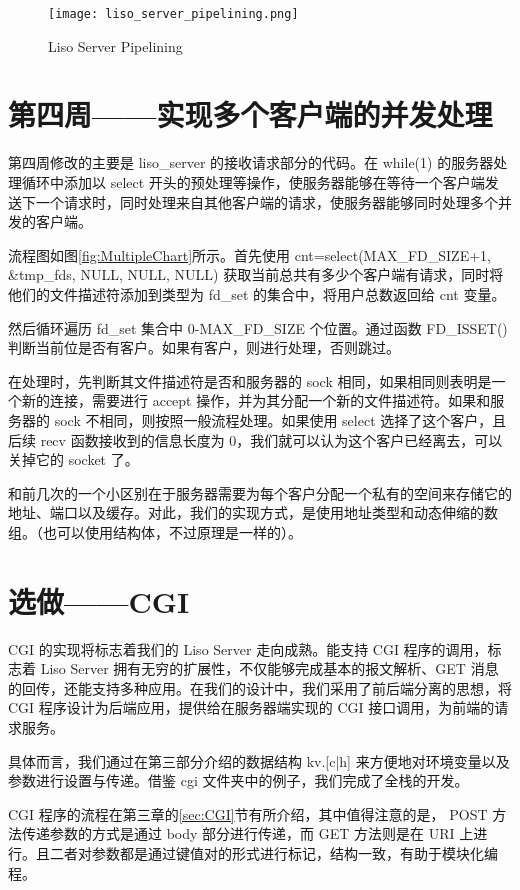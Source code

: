 \begin{figure}[htbp!]
    \centering
    \texttt{[image: liso\_server\_pipelining.png]}
    \caption{Liso Server Pipelining}\label{fig:liso_server_pipelining}
\end{figure}

\section{第四周——实现多个客户端的并发处理}

第四周修改的主要是 liso\_server 的接收请求部分的代码。在 while(1) 的服务器处理循环中添加以 select 开头的预处理等操作，使服务器能够在等待一个客户端发送下一个请求时，同时处理来自其他客户端的请求，使服务器能够同时处理多个并发的客户端。

流程图如图\ref{fig:MultipleChart}所示。首先使用 cnt=select(MAX\_FD\_SIZE+1, \&tmp\_fds, NULL, NULL, NULL) 获取当前总共有多少个客户端有请求，同时将他们的文件描述符添加到类型为 fd\_set 的集合中，将用户总数返回给 cnt 变量。

然后循环遍历 fd\_set 集合中 0-MAX\_FD\_SIZE 个位置。通过函数 FD\_ISSET() 判断当前位是否有客户。如果有客户，则进行处理，否则跳过。

在处理时，先判断其文件描述符是否和服务器的 sock 相同，如果相同则表明是一个新的连接，需要进行 accept 操作，并为其分配一个新的文件描述符。如果和服务器的 sock 不相同，则按照一般流程处理。如果使用 select 选择了这个客户，且后续 recv 函数接收到的信息长度为 0，我们就可以认为这个客户已经离去，可以关掉它的 socket 了。

和前几次的一个小区别在于服务器需要为每个客户分配一个私有的空间来存储它的地址、端口以及缓存。对此，我们的实现方式，是使用地址类型和动态伸缩的数组。（也可以使用结构体，不过原理是一样的）。

\section{选做——CGI}

CGI 的实现将标志着我们的 Liso Server 走向成熟。能支持 CGI 程序的调用，标志着 Liso Server 拥有无穷的扩展性，不仅能够完成基本的报文解析、GET 消息的回传，还能支持多种应用。在我们的设计中，我们采用了前后端分离的思想，将 CGI 程序设计为后端应用，提供给在服务器端实现的 CGI 接口调用，为前端的请求服务。

具体而言，我们通过在第三部分介绍的数据结构 kv.[c|h] 来方便地对环境变量以及参数进行设置与传递。借鉴 cgi 文件夹中的例子，我们完成了全栈的开发。

CGI 程序的流程在第三章的\ref{sec:CGI}节有所介绍，其中值得注意的是， POST 方法传递参数的方式是通过 body 部分进行传递，而 GET 方法则是在 URI 上进行。且二者对参数都是通过键值对的形式进行标记，结构一致，有助于模块化编程。


